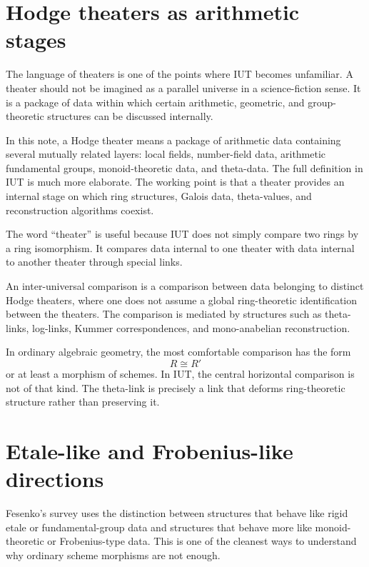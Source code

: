 \section{Hodge theaters as arithmetic stages}

The language of theaters is one of the points where IUT becomes unfamiliar.  A theater should not be imagined as a parallel universe in a science-fiction sense.  It is a package of data within which certain arithmetic, geometric, and group-theoretic structures can be discussed internally.

\begin{definition}
In this note, a Hodge theater means a package of arithmetic data containing several mutually related layers: local fields, number-field data, arithmetic fundamental groups, monoid-theoretic data, and theta-data.  The full definition in IUT is much more elaborate.  The working point is that a theater provides an internal stage on which ring structures, Galois data, theta-values, and reconstruction algorithms coexist.
\end{definition}

The word ``theater'' is useful because IUT does not simply compare two rings by a ring isomorphism.  It compares data internal to one theater with data internal to another theater through special links.

\begin{definition}
An inter-universal comparison is a comparison between data belonging to distinct Hodge theaters, where one does not assume a global ring-theoretic identification between the theaters.  The comparison is mediated by structures such as theta-links, log-links, Kummer correspondences, and mono-anabelian reconstruction.
\end{definition}

In ordinary algebraic geometry, the most comfortable comparison has the form
\[
  R\cong R'
\]
or at least a morphism of schemes.  In IUT, the central horizontal comparison is not of that kind.  The theta-link is precisely a link that deforms ring-theoretic structure rather than preserving it.

\section{Etale-like and Frobenius-like directions}

Fesenko's survey uses the distinction between structures that behave like rigid etale or fundamental-group data and structures that behave more like monoid-theoretic or Frobenius-type data.  This is one of the cleanest ways to understand why ordinary scheme morphisms are not enough.

